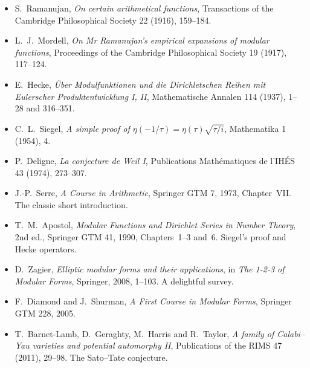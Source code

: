 \begin{itemize}
\item S.~Ramanujan, \emph{On certain arithmetical functions}, Transactions of the Cambridge Philosophical Society 22 (1916), 159--184.
\item L.~J.~Mordell, \emph{On Mr Ramanujan's empirical expansions of modular functions}, Proceedings of the Cambridge Philosophical Society 19 (1917), 117--124.
\item E.~Hecke, \emph{Über Modulfunktionen und die Dirichletschen Reihen mit Eulerscher Produktentwicklung I, II}, Mathematische Annalen 114 (1937), 1--28 and 316--351.
\item C.~L.~Siegel, \emph{A simple proof of $\eta(-1/\tau)=\eta(\tau)\sqrt{\tau/i}$}, Mathematika 1 (1954), 4.
\item P.~Deligne, \emph{La conjecture de Weil I}, Publications Mathématiques de l'IHÉS 43 (1974), 273--307.
\item J.-P.~Serre, \emph{A Course in Arithmetic}, Springer GTM 7, 1973, Chapter~VII. The classic short introduction.
\item T.~M.~Apostol, \emph{Modular Functions and Dirichlet Series in Number Theory}, 2nd ed., Springer GTM 41, 1990, Chapters~1--3 and~6. Siegel's proof and Hecke operators.
\item D.~Zagier, \emph{Elliptic modular forms and their applications}, in \emph{The 1-2-3 of Modular Forms}, Springer, 2008, 1--103. A delightful survey.
\item F.~Diamond and J.~Shurman, \emph{A First Course in Modular Forms}, Springer GTM 228, 2005.
\item T.~Barnet-Lamb, D.~Geraghty, M.~Harris and R.~Taylor, \emph{A family of Calabi--Yau varieties and potential automorphy II}, Publications of the RIMS 47 (2011), 29--98. The Sato--Tate conjecture.
\end{itemize}
